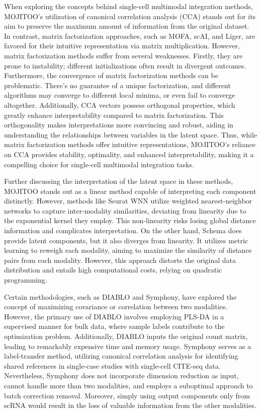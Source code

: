 When exploring the concepts behind single-cell multimodal integration methods, MOJITOO's utilization of canonical correlation analysis (CCA) stands out for its aim to preserve the maximum amount of information from the original dataset. In contrast, matrix factorization approaches, such as MOFA, scAI, and Liger, are favored for their intuitive representation via matrix multiplication. However, matrix factorization methods suffer from several weaknesses. Firstly, they are prone to instability; different initializations often result in divergent outcomes. Furthermore, the convergence of matrix factorization methods can be problematic. There's no guarantee of a unique factorization, and different algorithms may converge to different local minima, or even fail to converge altogether. Additionally, CCA vectors possess orthogonal properties, which greatly enhance interpretability compared to matrix factorization. This orthogonality makes interpretations more convincing and robust, aiding in understanding the relationships between variables in the latent space. Thus, while matrix factorization methods offer intuitive representations, MOJITOO's reliance on CCA provides stability, optimality, and enhanced interpretability, making it a compelling choice for single-cell multimodal integration tasks.



Further discussing the interpretation of the latent space in these methods, MOJITOO stands out as a linear method capable of interpreting each component distinctly. However, methods like Seurat WNN utilize weighted nearest-neighbor networks to capture inter-modality similarities, deviating from linearity due to the exponential kernel they employ. This non-linearity risks losing global distance information and complicates interpretation. On the other hand, Schema does provide latent components, but it also diverges from linearity. It utilizes metric learning to reweigh each modality, aiming to maximize the similarity of distance pairs from each modality. However, this approach distorts the original data distribution and entails high computational costs, relying on quadratic programming.


Certain methodologies, such as DIABLO and Symphony, have explored the concept of maximizing covariance or correlation between two modalities. However, the primary use of DIABLO involves employing PLS-DA in a supervised manner for bulk data, where sample labels contribute to the optimization problem. Additionally, DIABLO inputs the original count matrix, leading to remarkably expensive time and memory usage. Symphony serves as a label-transfer method, utilizing canonical correlation analysis for identifying shared references in single-case studies with single-cell CITE-seq data. Nevertheless, Symphony does not incorporate dimension reduction as input, cannot handle more than two modalities, and employs a suboptimal approach to batch correction removal. Moreover, simply using output components only from scRNA would result in the loss of valuable information from the other modalities.


